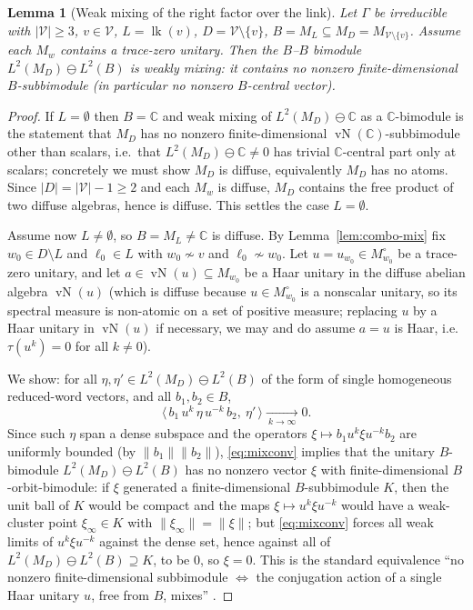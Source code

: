 \documentclass[11pt]{article}
\newtheorem{lemma}{Lemma}
\DeclareMathOperator{\vN}{vN}
\DeclareMathOperator{\link}{lk}
\newcommand{\Gra}{\Gamma}
\newcommand{\VV}{\mathcal V}
\newcommand{\norm}[1]{\lVert #1\rVert}
\newcommand{\abs}[1]{\lvert #1\rvert}
\newcommand{\set}[1]{\{#1\}}
\begin{document}
\begin{lemma}[Weak mixing of the right factor over the link]\label{lem:weakmix}
Let $\Gra$ be irreducible with $\abs\VV\ge3$, $v\in\VV$, $L=\link(v)$, $D=\VV\setminus\set v$,
$B=M_L\subseteq M_D=M_{\VV\setminus\set v}$. Assume each $M_w$ contains a trace-zero unitary. Then the
$B$--$B$ bimodule $L^2(M_D)\ominus L^2(B)$ is weakly mixing: it contains no nonzero finite-dimensional
$B$-subbimodule (in particular no nonzero $B$-central vector).
\end{lemma}

\begin{proof}
If $L=\emptyset$ then $B=\mathbb C$ and weak mixing of $L^2(M_D)\ominus\mathbb C$ as a $\mathbb C$-bimodule is
the statement that $M_D$ has no nonzero finite-dimensional $\vN(\mathbb C)$-subbimodule other than scalars,
i.e.\ that $L^2(M_D)\ominus\mathbb C\ne0$ has trivial $\mathbb C$-central part only at scalars; concretely we
must show $M_D$ is diffuse, equivalently $M_D$ has no atoms. Since $\abs{D}=\abs\VV-1\ge2$ and each $M_w$ is
diffuse, $M_D$ contains the free product of two diffuse algebras, hence is diffuse. This settles the case
$L=\emptyset$.

Assume now $L\ne\emptyset$, so $B=M_L\ne\mathbb C$ is diffuse. By Lemma~\ref{lem:combo-mix} fix
$w_0\in D\setminus L$ and $\ell_0\in L$ with $w_0\not\sim v$ and $\ell_0\not\sim w_0$. Let $u=u_{w_0}\in
M_{w_0}^\circ$ be a trace-zero unitary, and let $a\in\vN(u)\subseteq M_{w_0}$ be a Haar unitary in the
diffuse abelian algebra $\vN(u)$ (which is diffuse because $u\in M_{w_0}^\circ$ is a nonscalar unitary, so
its spectral measure is non-atomic on a set of positive measure; replacing $u$ by a Haar unitary in
$\vN(u)$ if necessary, we may and do assume $a=u$ is Haar, i.e.\ $\tau(u^k)=0$ for all $k\ne0$).

We show: for all $\eta,\eta'\in L^2(M_D)\ominus L^2(B)$ of the form of single homogeneous reduced-word
vectors, and all $b_1,b_2\in B$,
\begin{equation}\label{eq:mixconv}
\big\langle\, b_1\,u^{k}\,\eta\,u^{-k}\,b_2,\ \eta'\,\big\rangle \xrightarrow[\ k\to\infty\ ]{} 0 .
\end{equation}
Since such $\eta$ span a dense subspace and the operators $\xi\mapsto b_1 u^k\xi u^{-k}b_2$ are uniformly
bounded (by $\norm{b_1}\norm{b_2}$), \eqref{eq:mixconv} implies that the unitary
$B$-bimodule $L^2(M_D)\ominus L^2(B)$ has no nonzero vector $\xi$ with finite-dimensional
$B$-orbit-bimodule: if $\xi$ generated a finite-dimensional $B$-subbimodule $K$, then the unit ball of $K$
would be compact and the maps $\xi\mapsto u^k\xi u^{-k}$ would have a weak-cluster point $\xi_\infty\in K$
with $\norm{\xi_\infty}=\norm\xi$; but \eqref{eq:mixconv} forces all weak limits of $u^k\xi u^{-k}$ against
the dense set, hence against all of $L^2(M_D)\ominus L^2(B)\supseteq K$, to be $0$, so $\xi=0$. This is the
standard equivalence ``no nonzero finite-dimensional subbimodule $\Leftrightarrow$ the conjugation action of
a single Haar unitary $u$, free from $B$, mixes'' \cite{CFG}.


\end{proof}
\end{document}
